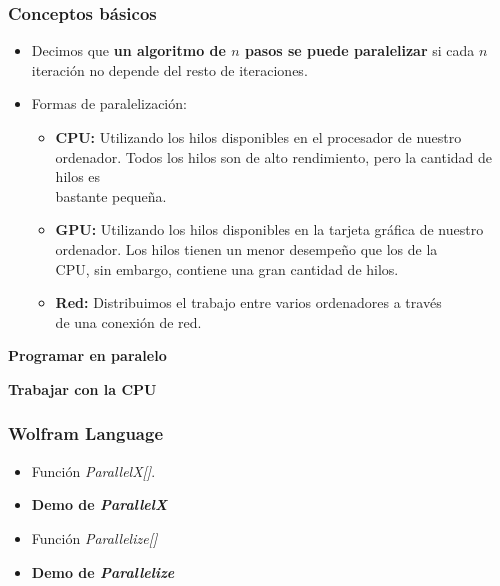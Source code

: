 \documentclass[aspectratio=169]{beamer}
\begin{document}
\begin{frame}
	\frametitle{Conceptos básicos}

	\begin{itemize}
		\item Decimos que \textbf{un algoritmo de $n$ pasos se puede paralelizar} si cada $n$ iteración no depende del resto de iteraciones.
		\pause
		\item Formas de paralelización:
		\begin{itemize}
			\item \textbf{CPU:} Utilizando los hilos disponibles en el procesador de nuestro ordenador. Todos los hilos son de alto rendimiento, pero la cantidad de hilos es \\bastante pequeña.
			\pause
			\item \textbf{GPU:} Utilizando los hilos disponibles en la tarjeta gráfica de nuestro\\ ordenador. Los hilos tienen un menor desempeño que los de la \\CPU, sin embargo, contiene una gran cantidad de hilos.
			\pause 
			\item \textbf{Red:} Distribuimos el trabajo entre varios ordenadores a través\\ de una conexión de red.
		\end{itemize}
	\end{itemize}
\end{frame}

\begin{frame}
	\centering \LARGE \bfseries \color{azulUCA} Programar en paralelo
\end{frame}

\begin{frame}
	\centering \LARGE \bfseries \color{naranjaUCA} Trabajar con la CPU
\end{frame}

\begin{frame}
	\frametitle{Wolfram Language}
	
	\begin{itemize}
		\item Función \textit{ParallelX[]}.
		\pause
		\item \pause \textbf{Demo de \textit{ParallelX}}
		\pause
		\item Función \textit{Parallelize[]}
		\pause
		\item \pause \textbf{Demo de \textit{Parallelize}}
		\pause
	\end{itemize}
\end{frame}
\end{document}
